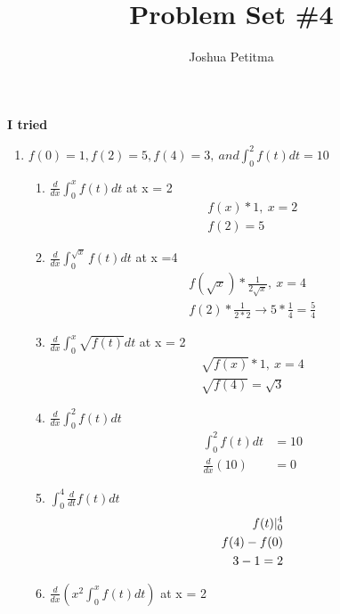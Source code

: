 \documentclass[11pt]{article}
\author{Joshua Petitma}
\title{Problem Set \#4}
\date{}
\begin{document}
    \maketitle
    \textbf{I tried}
    \begin{enumerate}
        \item \Large $f(0) = 1, f(2)= 5, f(4) = 3,\ and \int_{0}^{2}f(t)dt = 10$\\
        \begin{enumerate}
            \item \Large  $\frac{d}{dx}\int_{0}^{x}f(t)dt$ at x = 2 \label{q:1a}
            \begin{align*}
                \label{eq:1a}
                f(x) * 1,\ x=2 \\
                f(2) = 5
            \end{align*}
            \item \Large ${\frac{d}{dx}}\int_{0}^{\sqrt{x}}f(t)dt$ at x =4 \label{q:1b}
            \begin{align*}
                \label{eq:1b}
                f(\sqrt{x}) * \frac{1}{2\sqrt{x}},\ x=4 \\
                f(2)*\frac{1}{2*2} \to 5 * \frac{1}{4} = \frac{5}{4}
            \end{align*}
            \item \Large ${\frac{d}{dx}}\int_{0}^{x}\sqrt{f(t)}dt $ at x = 2 \label{q:1c}
            \begin{align*}
                \label{eq:1c}
                \sqrt{f(x)}*1,\ x=4 \\
                \sqrt{f(4)} = \sqrt{3}
            \end{align*}
            \item \Large ${\frac{d}{dx}}\int_{0}^{2}f(t)dt$ \label{q:1d}
            \begin{align*}
                \label{eq:1d}
                \int_{0}^{2}f(t)dt &= 10 \\
                \frac{d}{dx}(10) &= 0
            \end{align*}
            \item \Large ${\int_{0}^{4} \frac{d}{dt}f(t)dt}$\label{q:1e}
            \begin{align*}
                \label{eq:1e}
                f(t)\arrowvert_{0}^{4} \\
                f(4) - f(0) \\
                3 - 1 = 2
            \end{align*}
            \item \Large ${\frac{d}{dx}(x^2 \int_{0}^{x}f(t)dt)}$ at x = 2 \label{q:1f}

\end{enumerate}
\end{enumerate}
\end{document}
